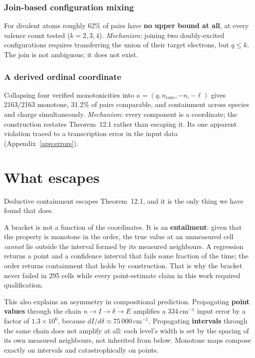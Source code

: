 \documentclass[11pt,a4paper]{article}
\theoremstyle{definition}
\newcommand{\cmi}{\,\ensuremath{\mathrm{cm}^{-1}}}
\begin{document}
\subsubsection*{Join-based configuration mixing}
For divalent atoms roughly 62\% of pairs have \textbf{no upper bound at all}, at
every valence count tested ($k=2,3,4$). \emph{Mechanism:} joining two
doubly-excited configurations requires transferring the union of their target
electrons, but $q\le k$. The join is not ambiguous; it does not exist.

\subsubsection*{A derived ordinal coordinate}
Collapsing four verified monotonicities into
$\kappa=(q,n_{\mathrm{core}},-n,-\ell)$ gives 2163/2163 monotone, 31.2\% of
pairs comparable, and containment across species and charge simultaneously.
\emph{Mechanism:} every component is a coordinate; the construction restates
Theorem~12.1 rather than escaping it. Its one apparent violation traced to a
transcription error in the input data (Appendix~\ref{app:errors}).

\section{What escapes}
Deductive containment escapes Theorem~12.1, and it is the only thing we have
found that does.

A bracket is not a function of the coordinates. It is an \textbf{entailment}:
given that the property is monotone in the order, the true value at an
unmeasured cell \emph{cannot} lie outside the interval formed by its measured
neighbours. A regression returns a point and a confidence interval that fails
some fraction of the time; the order returns containment that holds by
construction. That is why the bracket never failed in 295 cells while every
point-estimate claim in this work required qualification.

This also explains an asymmetry in compositional prediction. Propagating
\textbf{point values} through the chain $n\to I\to\delta\to E$ amplifies a
334\cmi{} input error by a factor of $1.3\times10^{6}$, because
$dI/d\delta\approx75\,000$\cmi. Propagating \textbf{intervals} through the same
chain does not amplify at all: each level's width is set by the spacing of its
own measured neighbours, not inherited from below. Monotone maps compose exactly
on intervals and catastrophically on points.
\end{document}
